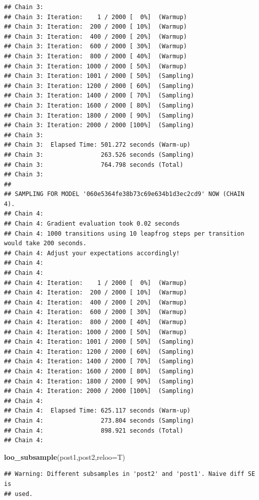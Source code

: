 \documentclass[]{article}
\newenvironment{Shaded}{\begin{snugshade}}{\end{snugshade}}
\newcommand{\DataTypeTok}[1]{\textcolor[rgb]{0.13,0.29,0.53}{#1}}
\newcommand{\KeywordTok}[1]{\textcolor[rgb]{0.13,0.29,0.53}{\textbf{#1}}}
\newcommand{\NormalTok}[1]{#1}
\begin{document}
\begin{verbatim}
## Chain 3: 
## Chain 3: Iteration:    1 / 2000 [  0%]  (Warmup)
## Chain 3: Iteration:  200 / 2000 [ 10%]  (Warmup)
## Chain 3: Iteration:  400 / 2000 [ 20%]  (Warmup)
## Chain 3: Iteration:  600 / 2000 [ 30%]  (Warmup)
## Chain 3: Iteration:  800 / 2000 [ 40%]  (Warmup)
## Chain 3: Iteration: 1000 / 2000 [ 50%]  (Warmup)
## Chain 3: Iteration: 1001 / 2000 [ 50%]  (Sampling)
## Chain 3: Iteration: 1200 / 2000 [ 60%]  (Sampling)
## Chain 3: Iteration: 1400 / 2000 [ 70%]  (Sampling)
## Chain 3: Iteration: 1600 / 2000 [ 80%]  (Sampling)
## Chain 3: Iteration: 1800 / 2000 [ 90%]  (Sampling)
## Chain 3: Iteration: 2000 / 2000 [100%]  (Sampling)
## Chain 3: 
## Chain 3:  Elapsed Time: 501.272 seconds (Warm-up)
## Chain 3:                263.526 seconds (Sampling)
## Chain 3:                764.798 seconds (Total)
## Chain 3: 
## 
## SAMPLING FOR MODEL '060e5364fe38b73c69e634b1d3ec2cd9' NOW (CHAIN 4).
## Chain 4: 
## Chain 4: Gradient evaluation took 0.02 seconds
## Chain 4: 1000 transitions using 10 leapfrog steps per transition would take 200 seconds.
## Chain 4: Adjust your expectations accordingly!
## Chain 4: 
## Chain 4: 
## Chain 4: Iteration:    1 / 2000 [  0%]  (Warmup)
## Chain 4: Iteration:  200 / 2000 [ 10%]  (Warmup)
## Chain 4: Iteration:  400 / 2000 [ 20%]  (Warmup)
## Chain 4: Iteration:  600 / 2000 [ 30%]  (Warmup)
## Chain 4: Iteration:  800 / 2000 [ 40%]  (Warmup)
## Chain 4: Iteration: 1000 / 2000 [ 50%]  (Warmup)
## Chain 4: Iteration: 1001 / 2000 [ 50%]  (Sampling)
## Chain 4: Iteration: 1200 / 2000 [ 60%]  (Sampling)
## Chain 4: Iteration: 1400 / 2000 [ 70%]  (Sampling)
## Chain 4: Iteration: 1600 / 2000 [ 80%]  (Sampling)
## Chain 4: Iteration: 1800 / 2000 [ 90%]  (Sampling)
## Chain 4: Iteration: 2000 / 2000 [100%]  (Sampling)
## Chain 4: 
## Chain 4:  Elapsed Time: 625.117 seconds (Warm-up)
## Chain 4:                273.804 seconds (Sampling)
## Chain 4:                898.921 seconds (Total)
## Chain 4:
\end{verbatim}

\begin{Shaded}
\begin{Highlighting}[]
\KeywordTok{loo_subsample}\NormalTok{(post1,post2,}\DataTypeTok{reloo=}\NormalTok{T)}
\end{Highlighting}
\end{Shaded}

\begin{verbatim}
## Warning: Different subsamples in 'post2' and 'post1'. Naive diff SE is
## used.
\end{verbatim}
\end{document}
